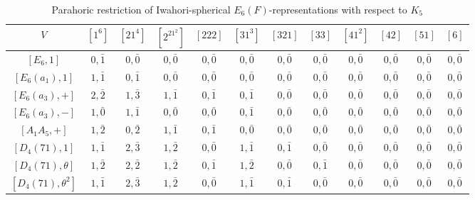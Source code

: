     \newpage
    \begin{table}[ht]
        \centering
        \caption{Parahoric restriction of Iwahori-spherical $E_6(F)$-representations with respect to $K_5$}
        \label{tab:e6_WJ5_restriction_final}
        \begin{adjustbox}{max width=\linewidth}
        \begin{tabular}{|c|ccccccccccc|}
        \hline
        $V$ & $[1^6]$ & $[21^4]$ & $[2^21^2]$ & $[222]$ & $[31^3]$ & $[321]$ & $[33]$ & $[41^2]$ & $[42]$ & $[51]$ & $[6]$ \\ \hline
        $[E_6, 1]$             & $0, \bar{1}$ & $0, \bar{0}$ & $0, \bar{0}$ & $0, \bar{0}$ & $0, \bar{0}$ & $0, \bar{0}$ & $0, \bar{0}$ & $0, \bar{0}$ & $0, \bar{0}$ & $0, \bar{0}$ & $0, \bar{0}$ \\ \hline

        $[E_6(a_1), 1]$        & $1, \bar{1}$ & $0, \bar{1}$ & $0, \bar{0}$ & $0, \bar{0}$ & $0, \bar{0}$ & $0, \bar{0}$ & $0, \bar{0}$ & $0, \bar{0}$ & $0, \bar{0}$ & $0, \bar{0}$ & $0, \bar{0}$ \\ \hline

        $[E_6(a_3), +]$        & $2, \bar{2}$ & $1, \bar{3}$ & $1, \bar{1}$ & $0, \bar{1}$ & $0, \bar{1}$ & $0, \bar{0}$ & $0, \bar{0}$ & $0, \bar{0}$ & $0, \bar{0}$ & $0, \bar{0}$ & $0, \bar{0}$ \\
        $[E_6(a_3), -]$        & $1, \bar{0}$ & $1, \bar{1}$ & $0, \bar{0}$ & $0, \bar{0}$ & $0, \bar{1}$ & $0, \bar{0}$ & $0, \bar{0}$ & $0, \bar{0}$ & $0, \bar{0}$ & $0, \bar{0}$ & $0, \bar{0}$ \\
        $[A_1A_5, +]$          & $1, \bar{2}$ & $0, \bar{2}$ & $1, \bar{1}$ & $0, \bar{1}$ & $0, \bar{0}$ & $0, \bar{0}$ & $0, \bar{0}$ & $0, \bar{0}$ & $0, \bar{0}$ & $0, \bar{0}$ & $0, \bar{0}$ \\ \hline

        $[D_4(71), 1]$         & $1, \bar{1}$ & $2, \bar{3}$ & $1, \bar{2}$ & $0, \bar{0}$ & $1, \bar{1}$ & $0, \bar{1}$ & $0, \bar{0}$ & $0, \bar{0}$ & $0, \bar{0}$ & $0, \bar{0}$ & $0, \bar{0}$ \\ 
        $[D_4(71), \theta]$    & $1, \bar{2}$ & $2, \bar{2}$ & $1, \bar{2}$ & $0, \bar{1}$ & $1, \bar{2}$ & $0, \bar{0}$ & $0, \bar{1}$ & $0, \bar{0}$ & $0, \bar{0}$ & $0, \bar{0}$ & $0, \bar{0}$ \\
        $[D_4(71), \theta^2]$  & $1, \bar{1}$ & $2, \bar{3}$ & $1, \bar{2}$ & $0, \bar{0}$ & $1, \bar{1}$ & $0, \bar{1}$ & $0, \bar{0}$ & $0, \bar{0}$ & $0, \bar{0}$ & $0, \bar{0}$ & $0, \bar{0}$ \\\hline
        

\end{tabular}
\end{adjustbox}
\end{table}
